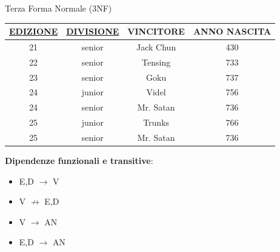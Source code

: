 \begin{frame}{Terza Forma Normale (3NF)}

\begin{minipage}[t]{0.45\textwidth}
    \begin{table}[h]
    \centering
    {\small %
    \begin{tabular}{|c|c|c|c|}
        \hline
        \rowcolor{cyan!30} \textbf{\underline{EDIZIONE}} & \textbf{\underline{DIVISIONE}} & \textbf{VINCITORE} & \textbf{ANNO NASCITA} \\ \hline
        21 & senior & Jack Chun & 430 \\ \hline
        22 & senior & Tensing & 733 \\ \hline
        23 & senior & Goku & 737 \\ \hline
        24 & junior & Videl & 756 \\ \hline
        24 & senior & Mr. Satan & 736 \\ \hline
        25 & junior & Trunks & 766 \\ \hline
        25 & senior & Mr. Satan & 736 \\ \hline
    \end{tabular}
    }
\end{table}
\end{minipage}
\hspace{2cm}
\hfill
\begin{minipage}[t]{0.45\textwidth}
\textbf{Dipendenze funzionali e transitive}:
\pause
\begin{itemize}[<+->]
    \item E,D $\rightarrow$ V
    \item V $\not\to$ E,D
    \item V $\rightarrow$ AN
    \item E,D $\rightarrow$ AN
\end{itemize}
\end{minipage}
\end{frame}
%
